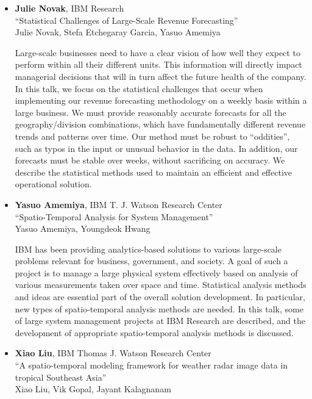 \begin{itemize}
\item \textbf{Julie Novak}, IBM Research \\
``Statistical Challenges of Large-Scale Revenue Forecasting'' \\
Julie Novak, Stefa Etchegaray Garcia, Yasuo Amemiya


Large-scale businesses need to have a clear vision of how well they expect to perform within all their different units. This information will directly impact managerial decisions that will in turn affect the future health of the company. In this talk, we focus on the statistical challenges that occur when implementing our revenue forecasting methodology on a weekly basis within a large business. We must provide reasonably accurate forecasts for all the geography/division combinations, which have fundamentally different revenue trends and patterns over time. Our method must be robust to “oddities”, such as typos in the input or unusual behavior in the data. In addition, our forecasts must be stable over weeks, without sacrificing on accuracy. We describe the statistical methods used to maintain an efficient and effective operational solution. 

\item \textbf{Yasuo Amemiya}, IBM T. J. Watson Research Center \\
``Spatio-Temporal Analysis for System Management'' \\
Yasuo Amemiya, Youngdeok Hwang


IBM has been providing analytics-based solutions to various large-scale problems relevant for business, government, and society.  A goal of such a project is to manage a large physical system effectively based on analysis of various measurements taken over space and time.  Statistical analysis methods and ideas are essential part of the overall solution development.  In particular, new types of spatio-temporal analysis methods are needed.  In this talk, some of large system management projects at IBM Research are described, and the development of appropriate spatio-temporal analysis methods is discussed.

\item \textbf{Xiao Liu}, IBM Thomas J. Watson Research Center \\
``A spatio-temporal modeling framework for weather radar image data in tropical Southeast Asia'' \\
Xiao Liu,   Vik Gopal,   Jayant Kalagnanam



\end{itemize}
